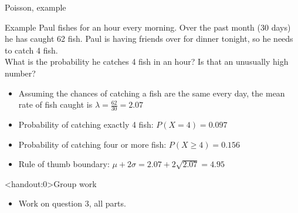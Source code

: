 \documentclass[xcolor=table]{beamer}
\begin{document}
\begin{frame}{Poisson, example}
\begin{exampleblock}{Example}
Paul fishes for an hour every morning. Over the past month (30 days) he has caught 62 fish. Paul is having friends over for dinner tonight, so he needs to catch 4 fish.\\
\medskip
What is the probability he catches 4 fish in an hour? Is that an unusually high number?
\begin{itemize}
\pause\item Assuming the chances of catching a fish are the same every day, the mean rate of fish caught is $\lambda = \frac {62}{30} = 2.07$
\pause\item Probability of catching exactly 4 fish: $P(X=4) = 0.097$
\pause\item Probability of catching four or more fish: $P(X \ge 4) = 0.156$
\pause\item Rule of thumb boundary: $\mu + 2 \sigma = 2.07 + 2 \sqrt{2.07} = 4.95$ 
\end{itemize}
\end{exampleblock}
\end{frame}

\begin{frame}<handout:0>{Group work}
\begin{block}{}
\large
\begin{itemize}
\item Work on question 3, all parts.
\end{itemize}
\end{block}
\end{frame}
\end{document}
